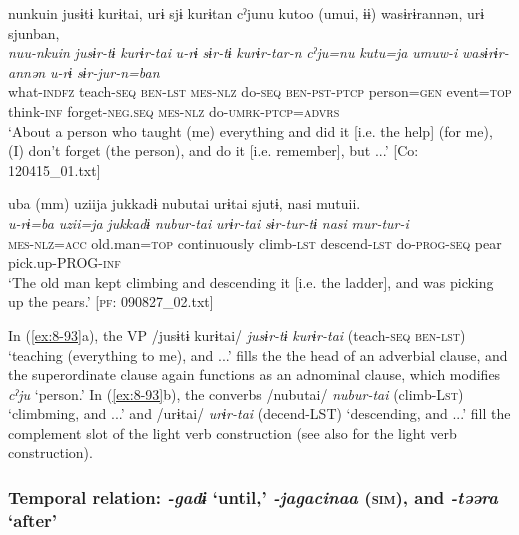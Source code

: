 \ea
{\TM}
\glll  nunkuin  jusɨtɨ  kurɨtai,  urɨ  sjɨ  kurɨtan      cˀjunu  kutoo  (umui,  ɨɨ)  wasɨrɨrannən,  urɨ      sjunban,\\
\textit{nuu-nkuin}  \textit{jusɨr-tɨ}  \textit{kurɨr-tai}  \textit{u-rɨ}  \textit{sɨr-tɨ}  \textit{kurɨr-tar-n}      \textit{cˀju=nu}  \textit{kutu=ja}  \textit{umuw-i}    \textit{wasɨrɨr-annən}  \textit{u-rɨ}      \textit{sɨr-jur-n=ban}\\
what-\textsc{indfz}  teach-\textsc{seq}  \textsc{ben}-\textsc{lst}  \textsc{mes}-\textsc{nlz}  do-\textsc{seq}  \textsc{ben}-\textsc{pst}-\textsc{ptcp}   person=\textsc{gen}  event=\textsc{top}  think-\textsc{inf}    forget-\textsc{neg}.\textsc{seq}  \textsc{mes}-\textsc{nlz} do-\textsc{umrk}-\textsc{ptcp}=\textsc{advrs}\\
\glt ‘About a person who taught (me) everything and did it [i.e. the help] (for me), (I) don’t forget (the person), and do it [i.e. remember], but ...’ [Co: 120415\_01.txt]

\ex
{\TM}
\glll  uba{\footnotemark} (mm)  uziija  jukkadɨ  nubutai    urɨtai  sjutɨ,  nasi  mutuii.\\
\textit{u-rɨ=ba}    \textit{uzii=ja}  \textit{jukkadɨ}  \textit{nubur-tai}  \textit{urɨr-tai}  \textit{sɨr-tur-tɨ}  \textit{nasi}  \textit{mur-tur-i}\\
\textsc{mes}-\textsc{nlz}=\textsc{acc}    old.man=\textsc{top}  continuously  climb-\textsc{lst}  descend-\textsc{lst}  do-\textsc{prog}-\textsc{seq}  pear  pick.up-PROG-\textsc{inf}\\
\glt ‘The old man kept climbing and descending it [i.e. the ladder], and was picking up the pears.’ [\textsc{pf}: 090827\_02.txt]
\z
\z

In (\ref{ex:8-93}a), the VP /jusɨtɨ kurɨtai/ \textit{jusɨr-tɨ} \textit{kurɨr-tai} (teach-\textsc{seq} \textsc{ben}-\textsc{lst}) ‘teaching (everything to me), and ...’ fills the the head of an adverbial clause, and the superordinate clause again functions as an adnominal clause, which modifies \textit{cˀju} ‘person.’ In (\ref{ex:8-93}b), the converbs /nubutai/ \textit{nubur-tai} (climb-L\textsc{st}) ‘climbming, and ...’ and /urɨtai/ \textit{urɨr-tai} (decend-LST) ‘descending, and ...’ fill the complement slot of the light verb construction (see also  for the light verb construction).

\subsubsection{Temporal relation: \textit{-gadɨ} ‘until,’ \textit{-jagacinaa} (\textsc{sim}), and \textit{-təəra} ‘after’}

